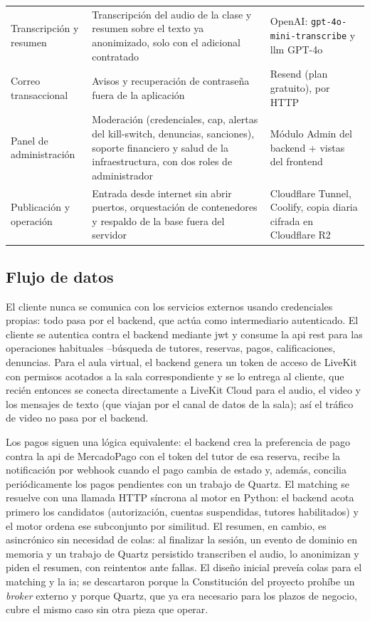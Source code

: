 \begin{table}[H]
\begin{tabularx}{\textwidth}{>{\raggedright\arraybackslash}p{3.1cm} L L}
        Transcripción y resumen & Transcripción del audio de la clase y resumen sobre el texto ya anonimizado, solo con el adicional contratado & OpenAI: \texttt{gpt-4o-mini-transcribe} y \gls{llm} GPT-4o \\
        Correo transaccional & Avisos y recuperación de contraseña fuera de la aplicación & Resend (plan gratuito), por HTTP \\
        Panel de administración & Moderación (credenciales, \gls{cap}, alertas del kill-switch, denuncias, sanciones), soporte financiero y salud de la infraestructura, con dos roles de administrador & Módulo Admin del backend + vistas  del frontend \\
        Publicación y operación & Entrada desde internet sin abrir puertos, orquestación de contenedores y respaldo de la base fuera del servidor & Cloudflare Tunnel, Coolify, copia diaria cifrada en Cloudflare R2 \\
        \bottomrule
    \end{tabularx}
\end{table}

\subsection{Flujo de datos}

El cliente nunca se comunica con los servicios externos usando
credenciales propias: todo pasa por el backend, que actúa como
intermediario autenticado. El cliente se autentica contra el backend
mediante \gls{jwt} y consume la \gls{api} \gls{rest} para las operaciones
habituales --búsqueda de tutores, reservas, pagos, calificaciones,
denuncias. Para el aula virtual, el backend genera un token de acceso de
LiveKit con permisos acotados a la sala correspondiente y se lo entrega
al cliente, que recién entonces se conecta directamente a LiveKit Cloud
para el audio, el video y los mensajes de texto (que viajan por el canal
de datos de la sala); así el tráfico de video no pasa por el backend.

Los pagos siguen una lógica equivalente: el backend crea la preferencia
de pago contra la \gls{api} de MercadoPago con el token del tutor de esa
reserva, recibe la notificación por webhook cuando el pago cambia de
estado y, además, concilia periódicamente los pagos pendientes con un
trabajo de Quartz. El \gls{matching} se resuelve con una llamada HTTP
síncrona al motor en Python: el backend acota primero los candidatos
(autorización, cuentas suspendidas, tutores habilitados) y el motor
ordena ese subconjunto por similitud. El resumen, en cambio, es
asincrónico sin necesidad de colas: al finalizar la sesión, un evento de
dominio en memoria y un trabajo de Quartz persistido transcriben el
audio, lo anonimizan y piden el resumen, con reintentos ante fallas. El
diseño inicial preveía colas para el \gls{matching} y la \gls{ia}; se
descartaron porque la Constitución del proyecto prohíbe un
\emph{broker} externo y porque Quartz, que ya era necesario para los
plazos de negocio, cubre el mismo caso sin otra pieza que operar.

